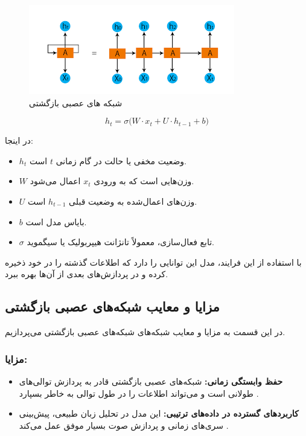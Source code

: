 \begin{figure}[h]
	\centering
	\begin{minipage}[b]{0.7\textwidth}
		\centering
		\includegraphics[width=\textwidth]{transformer_images/rnn_image.png}
		\caption{شبکه های عصبی بازگشتی}
		\label{fig:recurrent neural network}
	\end{minipage}
	\hfill
	
\end{figure}



\begin{equation}
	h_t = \sigma \big( W \cdot x_t + U \cdot h_{t-1} + b \big)
\end{equation}

در اینجا:
\begin{itemize}
	\item \( h_t \) وضعیت مخفی یا حالت در گام زمانی \( t \) است.
	\item \( W \) وزن‌هایی است که به ورودی \( x_t \) اعمال می‌شود.
	\item \( U \) وزن‌های اعمال‌شده به وضعیت قبلی \( h_{t-1} \) است.
	\item \( b \) بایاس مدل است.
	\item \( \sigma \) تابع فعال‌سازی، معمولاً تانژانت هیپربولیک یا سیگموید.
\end{itemize}

با استفاده از این فرایند، مدل این توانایی را دارد که اطلاعات گذشته را در خود ذخیره کرده و در پردازش‌های بعدی از آن‌ها بهره ببرد.

\subsection{مزایا و معایب شبکه‌های عصبی بازگشتی}
در این قسمت به مزایا و معایب شبکه‌های شبکه‌های عصبی بازگشتی می‌پردازیم.

\subsubsection{مزایا:}
\begin{itemize}
	\item \textbf{حفظ وابستگی زمانی:}  
شبکه‌های عصبی بازگشتی قادر به پردازش توالی‌های طولانی است و می‌تواند اطلاعات را در طول توالی به خاطر بسپارد
	\cite{elman1990finding}.
	
	\item \textbf{کاربردهای گسترده در داده‌های ترتیبی:}  
	این مدل در تحلیل زبان طبیعی، پیش‌بینی سری‌های زمانی و پردازش صوت بسیار موفق عمل می‌کند
	\cite{gers1999learning}.
\end{itemize}

